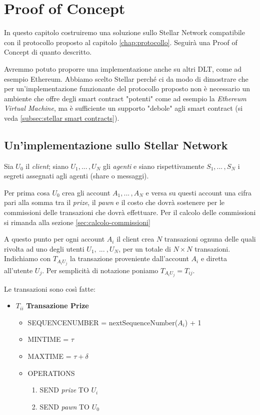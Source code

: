 \chapter{Proof of Concept}

In questo capitolo costruiremo una soluzione sullo Stellar Network
compatibile con il protocollo proposto al capitolo \ref{chap:protocollo}.
Seguirà una Proof of Concept di quanto descritto.

Avremmo potuto proporre una
implementazione anche su altri DLT, come ad esempio Ethereum. Abbiamo scelto
Stellar perché ci da modo di dimostrare che per un'implementazione funzionante
del protocollo proposto non è necessario un ambiente che
offre degli smart contract "potenti" come ad esempio
la \textit{Ethereum Virtual Machine},
ma è sufficiente un supporto
"debole" agli smart contract (si veda \ref{subsec:stellar smart contracts}).


\section{Un'implementazione sullo Stellar Network}
Sia $ U_0 $ il \textit{client};
siano $ U_1, ...\, , U_N $ gli \textit{agenti} e
siano rispettivamente $ S_1, ...\, , S_N $ i segreti assegnati agli agenti
(share o messaggi).

Per prima cosa $ U_0 $ crea gli account $ A_1, ...\, , A_N $ e
versa su questi account una cifra pari alla somma tra
il \textit{prize}, il \textit{pawn} e il costo che dovrà sostenere per le commissioni
delle transazioni che dovrà effettuare. Per il calcolo delle commissioni si rimanda
alla sezione \ref{sec:calcolo-commissioni}

A questo punto per ogni account $ A_i $ il client crea $ N $ transazioni
ognuna delle quali rivolta ad uno degli utenti $ U_1,\ ...\ , U_N $, per un totale
di $ N \times N $ transazioni. Indichiamo con $ T_{{A_i}{U_j}} $ la transazione
proveniente dall'account $ A_i $ e diretta all'utente $ U_j $.
Per semplicità di notazione poniamo $ T_{{A_i}{U_j}} = T_{ij} $.

Le transazioni sono così fatte:
\begin{itemize}
	\item $T_{ii} $ \textbf{Transazione Prize}
	      \begin{itemize}
		      \item SEQUENCE\textunderscore NUMBER = nextSequenceNumber($ A_i $) + 1
		      \item MIN\textunderscore TIME = $ \tau $
		      \item MAX\textunderscore TIME = $ \tau + \delta $
		      \item OPERATIONS
		            \begin{enumerate}
			            \item SEND \textit{prize} TO $ U_i $
			            \item SEND \textit{pawn} TO $ U_0 $
		            \end{enumerate}
	      \end{itemize}
\end{itemize}

